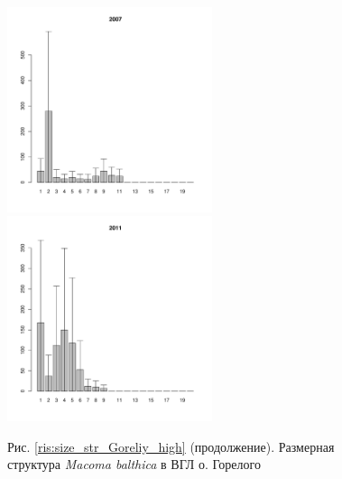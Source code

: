\documentclass[12pt, a4paper]{article}
\begin{document}
\begin{figure}[h]

\begin{multicols}{3}
\hfill
\includegraphics[width=60mm]{../White_Sea/Luvenga_Goreliy/high_2007_.pdf}
\hfill
\includegraphics[width=60mm]{../White_Sea/Luvenga_Goreliy/high_2011_.pdf}
\end{multicols}


\begin{center}
Рис. \ref{ris:size_str_Goreliy_high} (продолжение). Размерная структура {\it Macoma balthica} в ВГЛ о. Горелого

\end{center}
\end{figure}
\end{document}
